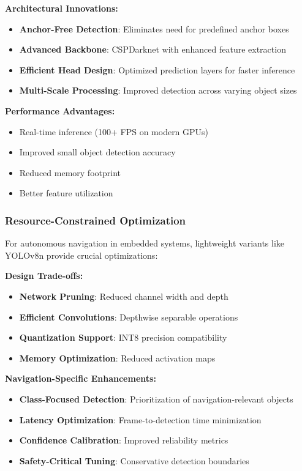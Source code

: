 \documentclass[12pt,oneside]{book}
\begin{document}
\textbf{Architectural Innovations:}
\begin{itemize}
    \item \textbf{Anchor-Free Detection}: Eliminates need for predefined anchor boxes
    \item \textbf{Advanced Backbone}: CSPDarknet with enhanced feature extraction
    \item \textbf{Efficient Head Design}: Optimized prediction layers for faster inference
    \item \textbf{Multi-Scale Processing}: Improved detection across varying object sizes
\end{itemize}

\textbf{Performance Advantages:}
\begin{itemize}
    \item Real-time inference (100+ FPS on modern GPUs)
    \item Improved small object detection accuracy
    \item Reduced memory footprint
    \item Better feature utilization
\end{itemize}

\subsubsection{Resource-Constrained Optimization}
For autonomous navigation in embedded systems, lightweight variants like YOLOv8n provide crucial optimizations:

\textbf{Design Trade-offs:}
\begin{itemize}
    \item \textbf{Network Pruning}: Reduced channel width and depth
    \item \textbf{Efficient Convolutions}: Depthwise separable operations
    \item \textbf{Quantization Support}: INT8 precision compatibility
    \item \textbf{Memory Optimization}: Reduced activation maps
\end{itemize}

\textbf{Navigation-Specific Enhancements:}
\begin{itemize}
    \item \textbf{Class-Focused Detection}: Prioritization of navigation-relevant objects
    \item \textbf{Latency Optimization}: Frame-to-detection time minimization
    \item \textbf{Confidence Calibration}: Improved reliability metrics
    \item \textbf{Safety-Critical Tuning}: Conservative detection boundaries
\end{itemize}
\end{document}
